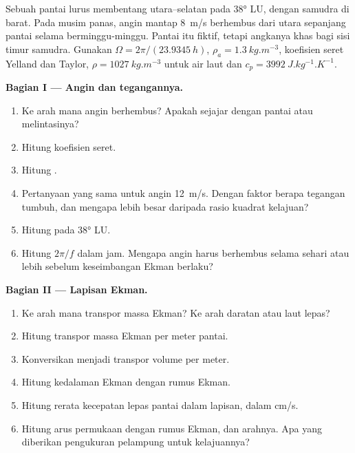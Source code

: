 \begin{problem}
\label{pb:b1:ocean-circulation:1}
Sebuah pantai lurus membentang utara--selatan pada \ang{38} LU, dengan samudra di barat. Pada musim panas, angin mantap \qty{8}{m/s} berhembus dari utara sepanjang pantai selama berminggu-minggu. Pantai itu fiktif, tetapi angkanya khas bagi sisi timur samudra. Gunakan $\Omega = 2\pi/(\qty{23.9345}{h})$, $\rho_a = \qty{1.3}{kg.m^{-3}}$, koefisien seret Yelland dan Taylor, $\rho = \qty{1027}{kg.m^{-3}}$ untuk air laut dan $c_p = \qty{3992}{J.kg^{-1}.K^{-1}}$.

\medskip
\noindent\textbf{Bagian I --- Angin dan tegangannya.}
\begin{enumerate}
  \item Ke arah mana angin berhembus? Apakah sejajar dengan pantai atau melintasinya?
  \item Hitung koefisien seret.
  \item Hitung .
  \item Pertanyaan yang sama untuk angin \qty{12}{m/s}. Dengan faktor berapa tegangan tumbuh, dan mengapa lebih besar daripada rasio kuadrat kelajuan?
  \item Hitung  pada \ang{38} LU.
  \item Hitung $2\pi/f$ dalam jam. Mengapa angin harus berhembus selama sehari atau lebih sebelum keseimbangan Ekman berlaku?
\end{enumerate}

\medskip
\noindent\textbf{Bagian II --- Lapisan Ekman.}
\begin{enumerate}[resume]
  \item Ke arah mana transpor massa Ekman? Ke arah daratan atau laut lepas?
  \item Hitung transpor massa Ekman per meter pantai.
  \item Konversikan menjadi transpor volume per meter.
  \item Hitung kedalaman Ekman dengan rumus Ekman.
  \item Hitung rerata kecepatan lepas pantai dalam lapisan, dalam \unit{cm/s}.
  \item Hitung arus permukaan dengan rumus Ekman, dan arahnya. Apa yang diberikan pengukuran pelampung untuk kelajuannya?
\end{enumerate}


\end{problem}
